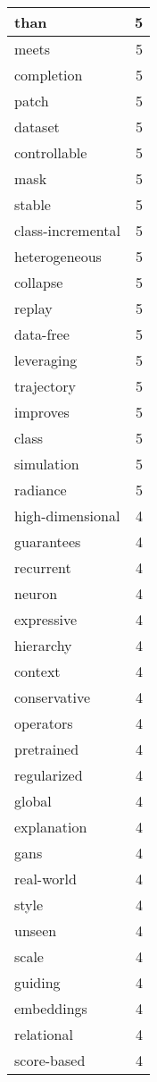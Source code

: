 \begin{table}[h]
\begin{tabular}{|l|r|}
\hline
than & 5 \\
\hline
meets & 5 \\
\hline
completion & 5 \\
\hline
patch & 5 \\
\hline
dataset & 5 \\
\hline
controllable & 5 \\
\hline
mask & 5 \\
\hline
stable & 5 \\
\hline
class-incremental & 5 \\
\hline
heterogeneous & 5 \\
\hline
collapse & 5 \\
\hline
replay & 5 \\
\hline
data-free & 5 \\
\hline
leveraging & 5 \\
\hline
trajectory & 5 \\
\hline
improves & 5 \\
\hline
class & 5 \\
\hline
simulation & 5 \\
\hline
radiance & 5 \\
\hline
high-dimensional & 4 \\
\hline
guarantees & 4 \\
\hline
recurrent & 4 \\
\hline
neuron & 4 \\
\hline
expressive & 4 \\
\hline
hierarchy & 4 \\
\hline
context & 4 \\
\hline
conservative & 4 \\
\hline
operators & 4 \\
\hline
pretrained & 4 \\
\hline
regularized & 4 \\
\hline
global & 4 \\
\hline
explanation & 4 \\
\hline
gans & 4 \\
\hline
real-world & 4 \\
\hline
style & 4 \\
\hline
unseen & 4 \\
\hline
scale & 4 \\
\hline
guiding & 4 \\
\hline
embeddings & 4 \\
\hline
relational & 4 \\
\hline
score-based & 4 \\

\end{tabular}
\end{table}
